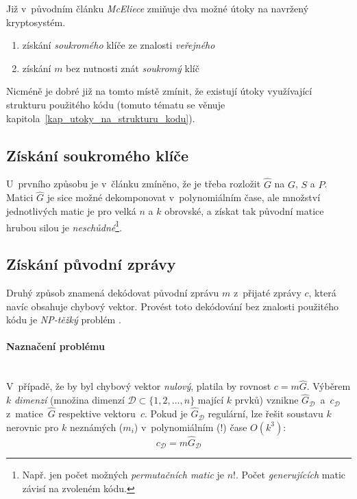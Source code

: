 \documentclass[thesis=M,czech,hidelinks]{FITthesis}[2012/06/26]
\newcommand{\0}{{\textcolor[gray]{0.75}{0}}}
\begin{document}
Již v~původním článku \cite{McEliece} \emph{McEliece} zmiňuje dva možné útoky na
navržený kryptosystém.

\begin{enumerate}
    \item získání \emph{soukromého} klíče ze znalosti \emph{veřejného}
    \item získání $m$ bez nutnosti znát \emph{soukromý} klíč
\end{enumerate}

Nicméně je dobré již na tomto místě zmínit, že existují útoky využívající
strukturu použitého kódu (tomuto tématu se věnuje
kapitola~\ref{kap_utoky_na_strukturu_kodu}).


\subsection{Získání soukromého klíče}

U~prvního způsobu je v~článku zmíněno, že je třeba rozložit $\hat{G}$ na $G$,
$S$ a $P$.  Matici $\hat{G}$ je sice možné dekomponovat v~polynomiálním čase,
ale množství jednotlivých matic je pro velká $n$ a $k$ obrovské, a získat tak
původní matice hrubou silou je \emph{neschůdné}\footnote{
    Např. jen počet možných \emph{permutačních matic} je $n!$. Počet
    \emph{generujících} matic závisí na zvoleném kódu.
}.


\subsection{Získání původní zprávy}

Druhý způsob znamená dekódovat původní zprávu $m$ z~přijaté zprávy $c$, která
navíc obsahuje chybový vektor. Provést toto dekódování bez znalosti použitého
kódu je \emph{NP-těžký} problém \cite{Berlekamp1}.


\paragraph{Naznačení problému} \hfil \\
V~případě, že by byl chybový vektor \emph{nulový}, platila by rovnost
$c = m\hat{G}$. Výběrem $k$ \emph{dimenzí} (množina dimenzí
$\mathcal{D} \subset \{1,2,\ldots,n\}$ mající $k$ prvků) vznikne
$\hat{G}_{\mathcal{D}}$~a~$c_{\mathcal{D}}$ z~matice~$\hat{G}$ respektive
vektoru~$c$. Pokud je $\hat{G}_{\mathcal{D}}$ regulární, lze řešit soustavu
$k$ nerovnic pro $k$ neznámých ($m_i$) v~polynomiálním (!) čase
$O\left(k^3\right)$:
$$ c_{\mathcal{D}} = m \hat{G}_{\mathcal{D}} $$
\end{document}

